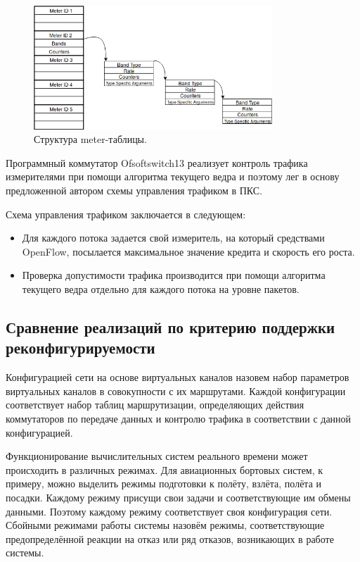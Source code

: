 \documentclass[12pt, a4paper]{article}
\begin{document}
\begin{figure}[h!]
	\centering
	\includegraphics[width=0.80\textwidth]{img/meter.png}
	\caption{Структура meter-таблицы.}
	\label{pic:scheme:meter}
\end{figure}

Программный коммутатор Ofsoftswitch13 \cite{ofsoftswitch} реализует контроль трафика измерителями при помощи алгоритма текущего ведра и поэтому лег в основу предложенной автором схемы управления трафиком в ПКС.

Схема управления трафиком заключается в следующем:
\begin{itemize}
	\item Для каждого потока задается свой измеритель, на который средствами OpenFlow, посылается максимальное значение кредита и скорость его роста.
	\item Проверка допустимости трафика производится при помощи алгоритма текущего ведра отдельно для каждого потока на уровне пакетов.
\end{itemize}

\FloatBarrier
\subsection{Сравнение реализаций по критерию поддержки реконфигурируемости} \label{subsec:reconf}

Конфигурацией сети на основе виртуальных каналов назовем набор параметров виртуальных каналов в совокупности с их маршрутами. Каждой конфигурации соответствует набор таблиц маршрутизации, определяющих действия коммутаторов по передаче данных и контролю трафика в соответствии с данной конфигурацией.

Функционирование вычислительных систем реального времени может происходить в различных режимах. Для авиационных бортовых систем, к примеру, можно выделить режимы подготовки к полёту, взлёта, полёта и посадки. Каждому режиму присущи свои задачи и соответствующие им обмены данными. Поэтому каждому режиму соответствует своя конфигурация сети. Сбойными режимами работы системы назовём режимы, соответствующие предопределённой реакции на отказ или ряд отказов, возникающих в работе системы.
\end{document}
